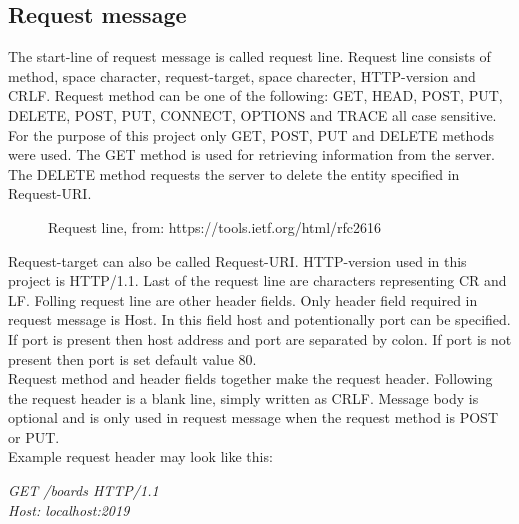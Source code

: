 \documentclass[11pt, a4paper]{article}
\begin{document}
	\subsection{Request message}
	The start-line of request message is called request line. \cite{Fiel:rfc7230} Request line consists of method, space character, request-target, space charecter, HTTP-version and CRLF. \hfill \break 
	Request method can be one of the following: GET, HEAD, POST, PUT, DELETE, POST, PUT, CONNECT, OPTIONS and TRACE all case sensitive. For the purpose
 	of this project only GET, POST, PUT and DELETE methods were used. The GET method is used for retrieving information from the server.  \cite{Fiel:rfc2616}
	The DELETE method requests the server to delete the entity specified in Request-URI.  \cite{Fiel:rfc7231} \hfill \break
	\begin{figure}[h]
			\centering
			\caption{Request line, from: https://tools.ietf.org/html/rfc2616}
			\label{obrazok1}
	\end{figure}
	\hfill \break
	Request-target can also be called Request-URI.  \cite{Fiel:rfc2616}
	HTTP-version used in this project is HTTP/1.1. Last of the request line are characters representing CR and LF. \hfill \break
	Folling request line are other header fields. Only header field required in request message is Host. In this field host and potentionally port can be specified. If port is 		present then host address and port are separated by colon. If port is not present then port is set default value 80. \\
	Request method and header fields together make the request header. Following the request header is a blank line, simply written as CRLF.
	Message body is optional and is only used in request message when the request method is POST or PUT. \\
	Example request header may look like this: \\ 
	\begin{center}
	\textit{GET /boards HTTP/1.1 \\ Host: localhost:2019 \\ }
	\end{center}
\end{document}
